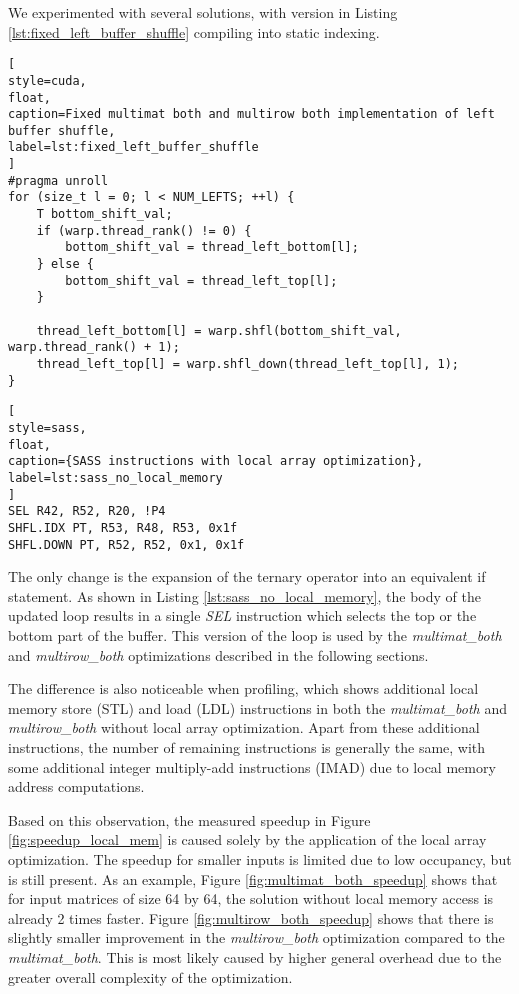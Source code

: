 We experimented with several solutions, with version in Listing \ref{lst:fixed_left_buffer_shuffle} compiling into static indexing.

\begin{lstlisting}[
style=cuda,
float,
caption=Fixed multimat both and multirow both implementation of left buffer shuffle,
label=lst:fixed_left_buffer_shuffle
]
#pragma unroll
for (size_t l = 0; l < NUM_LEFTS; ++l) {
	T bottom_shift_val;
	if (warp.thread_rank() != 0) {
		bottom_shift_val = thread_left_bottom[l];
	} else {
		bottom_shift_val = thread_left_top[l];
	}

	thread_left_bottom[l] = warp.shfl(bottom_shift_val, warp.thread_rank() + 1);
	thread_left_top[l] = warp.shfl_down(thread_left_top[l], 1);
}
\end{lstlisting}

\begin{lstlisting}[
style=sass,
float,
caption={SASS instructions with local array optimization},
label=lst:sass_no_local_memory
]
SEL R42, R52, R20, !P4
SHFL.IDX PT, R53, R48, R53, 0x1f
SHFL.DOWN PT, R52, R52, 0x1, 0x1f
\end{lstlisting}

The only change is the expansion of the ternary operator into an equivalent if statement. As shown in Listing \ref{lst:sass_no_local_memory}, the body of the updated loop results in a single \textit{SEL} instruction which selects the top or the bottom part of the buffer. This version of the loop is used by the \textit{multimat\_both} and \textit{multirow\_both} optimizations described in the following sections.

The difference is also noticeable when profiling, which shows additional local memory store (STL) and load (LDL) instructions in both the \textit{multimat\_both} and \textit{multirow\_both} without local array optimization. Apart from these additional instructions, the number of remaining instructions is generally the same, with some additional integer multiply-add instructions (IMAD) due to local memory address computations.

Based on this observation, the measured speedup in Figure \ref{fig:speedup_local_mem} is caused solely by the application of the local array optimization. The speedup for smaller inputs is limited due to low occupancy, but is still present. As an example, Figure \ref{fig:multimat_both_speedup} shows that for input matrices of size 64 by 64, the solution without local memory access is already 2 times faster. Figure \ref{fig:multirow_both_speedup} shows that there is slightly smaller improvement in the \textit{multirow\_both} optimization compared to the \textit{multimat\_both}. This is most likely caused by higher general overhead due to the greater overall complexity of the optimization.


